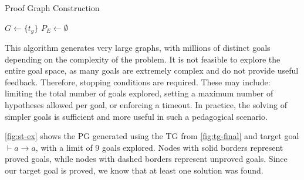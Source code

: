 \begin{algorithm}
\caption{Proof Graph Construction}
\label{alg:pg-construction}

$G \leftarrow \{t_g\}$
$P_E \leftarrow \emptyset$

\end{algorithm}

This algorithm generates very large graphs, with millions of distinct goals depending on the complexity of the problem. It is not feasible to explore the entire goal space, as many goals are extremely complex and do not provide useful feedback. Therefore, stopping conditions are required. These may include: limiting the total number of goals explored, setting a maximum number of hypotheses allowed per goal, or enforcing a timeout. In practice, the solving of simpler goals is sufficient and more useful in such a pedagogical scenario.

\autoref{fig:st-ex} shows the PG generated using the TG from \autoref{fig:tg-final} and target goal \(\vdash a \to a\), with a limit of 9 goals explored. Nodes with solid borders represent proved goals, while nodes with dashed borders represent unproved goals. Since our target goal is proved, we know that at least one solution was found.

